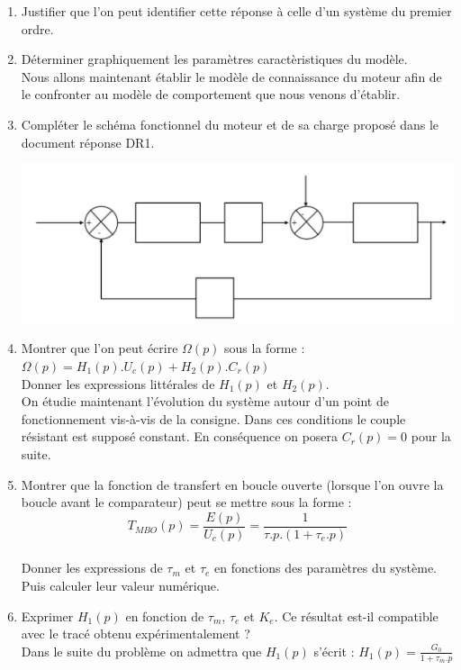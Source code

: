 \begin{enumerate}
\item Justifier que l'on peut identifier cette r\'eponse \`a celle d'un syst\`eme du premier ordre.
\item D\'eterminer graphiquement les param\`etres caract\`eristiques du mod\`ele.\\
Nous allons maintenant \'etablir le mod\`ele de connaissance du moteur afin de le confronter au mod\`ele
de comportement que nous venons d'\'etablir.
\item Compl\'eter le sch\'ema fonctionnel du moteur et de sa charge propos\'e dans le document
r\'eponse DR1.\\

\begin{center}
\includegraphics[scale=0.3]{png/image3_prob3.png}
\end{center}

\item Montrer que l'on peut \'ecrire $\Omega(p)$ sous la forme : $\Omega(p)=H_1(p).U_c(p)+H_2(p).C_r(p)$\\
Donner les expressions litt\'erales de $H_1(p)$ et $H_2(p)$.\\
On \'etudie maintenant l'\'evolution du syst\`eme autour d'un point de fonctionnement vis-\`a-vis de la consigne.
Dans ces conditions le couple r\'esistant est suppos\'e constant. En cons\'equence on posera $C_r(p)=0$ pour la suite.
\item Montrer que la fonction de transfert en boucle ouverte (lorsque l'on ouvre la boucle avant
le comparateur) peut se mettre sous la forme :\\
\[T_{MBO}(p)=\frac{E(p)}{U_c(p)}=\frac{1}{\tau .p.(1+ \tau_e . p)}\]\\
Donner les expressions de $\tau_m$ et $\tau_e$ en fonctions des param\`etres du syst\`eme. Puis calculer leur valeur num\'erique.
\item Exprimer $H_1(p)$ en fonction de $\tau_m$, $\tau_e$ et $K_e$. Ce r\'esultat est-il compatible avec le trac\'e obtenu exp\'erimentalement ?\\
Dans le suite du probl\`eme on admettra que $H_1(p)$ s'\'ecrit : $H_1(p)= \frac{G_0}{1+\tau_m . p}$
\end{enumerate}

